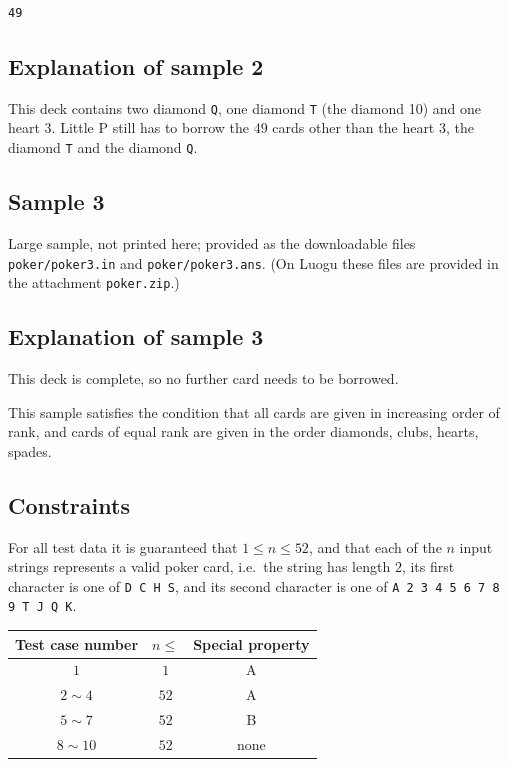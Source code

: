 \documentclass[11pt]{article}
\begin{document}
\begin{verbatim}
49
\end{verbatim}

\subsection*{Explanation of sample 2}

This deck contains two diamond \texttt{Q}, one diamond \texttt{T}
(the diamond 10) and one heart 3.
Little P still has to borrow the $49$ cards other than the heart 3, the
diamond \texttt{T} and the diamond \texttt{Q}.

\subsection*{Sample 3}

Large sample, not printed here;
provided as the downloadable files \texttt{poker/poker3.in} and \texttt{poker/poker3.ans}.
(On Luogu these files are provided in the attachment \texttt{poker.zip}.)

\subsection*{Explanation of sample 3}

This deck is complete, so no further card needs to be borrowed.

This sample satisfies the condition that all cards are given in increasing
order of rank, and cards of equal rank are given in the order diamonds,
clubs, hearts, spades.

\subsection*{Constraints}

For all test data it is guaranteed that $1 \leq n \leq 52$, and that each of
the $n$ input strings represents a valid poker card, i.e.\ the string has
length $2$, its first character is one of \texttt{D C H S}, and its second
character is one of \texttt{A 2 3 4 5 6 7 8 9 T J Q K}.

\begin{center}
\begin{tabular}{ccc}
\toprule
Test case number & $n \leq$ & Special property \\
\midrule
$1$ & $1$ & A \\
$2 \sim 4$ & $52$ & A \\
$5 \sim 7$ & $52$ & B \\
$8 \sim 10$ & $52$ & none \\
\bottomrule
\end{tabular}
\end{center}
\end{document}
